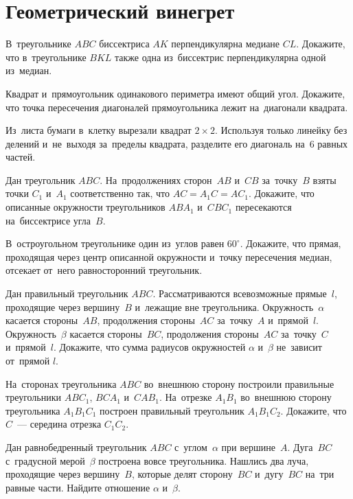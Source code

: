 
\section*{Геометрический винегрет}


\begin{problems}

\item
В~треугольнике $ABC$ биссектриса $AK$ перпендикулярна медиане $CL$.
Докажите, что в~треугольнике $BKL$ также одна из~биссектрис перпендикулярна
одной из~медиан.

\item
Квадрат и~прямоугольник одинакового периметра имеют общий угол.
Докажите, что точка пересечения диагоналей прямоугольника лежит на~диагонали
квадрата.

\item
Из~листа бумаги в~клетку вырезали квадрат $2 \times 2$.
Используя только линейку без делений и~не~выходя за~пределы квадрата, разделите
его диагональ на~$6$ равных частей.

\item
Дан треугольник $ABC$.
На~продолжениях сторон~$AB$ и~$CB$ за~точку~$B$ взяты точки $C_1$ и~$A_1$
соответственно так, что $AC = A_1 C = A C_1$.
Докажите, что описанные окружности треугольников $A B A_1$ и~$C B C_1$
пересекаются на~биссектрисе угла~$B$.

\item
В~остроугольном треугольнике один из~углов равен $60^{\circ}$.
Докажите, что прямая, проходящая через центр описанной окружности и~точку
пересечения медиан, отсекает от~него равносторонний треугольник.

\item
Дан правильный треугольник $ABC$.
Рассматриваются всевозможные прямые~$l$, проходящие через вершину~$B$ и~лежащие
вне треугольника.
Окружность~$\alpha$ касается стороны~$AB$, продолжения стороны~$AC$
за~точку~$A$ и~прямой~$l$.
Окружность~$\beta$ касается стороны~$BC$, продолжения стороны~$AC$ за~точку~$C$
и~прямой~$l$.
Докажите, что сумма радиусов окружностей $\alpha$ и~$\beta$ не~зависит
от~прямой $l$.

\item
На~сторонах треугольника $ABC$ во~внешнюю сторону построили правильные
треугольники $A B C_1$, $B C A_1$ и~$C A B_1$.
На~отрезке $A_1 B_1$ во~внешнюю сторону треугольника $A_1 B_1 C_1$ построен
правильный треугольник $A_1 B_1 C_2$.
Докажите, что $C$~--- середина отрезка $C_1 C_2$.

\item
Дан равнобедренный треугольник $ABC$ с~углом~$\alpha$ при вершине~$A$.
Дуга~$BC$ с~градусной мерой~$\beta$ построена вовсе треугольника.
Нашлись два луча, проходящие через вершину~$B$, которые делят сторону~$BC$
и~дугу~$BC$ на~три равные части.
Найдите отношение $\alpha$ и~$\beta$.

\end{problems}

